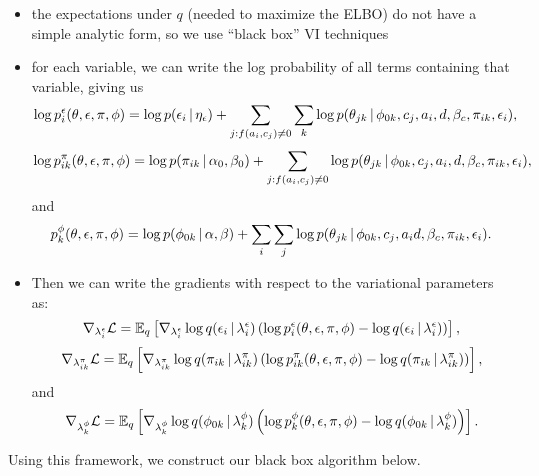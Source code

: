 \begin{itemize}
\item the expectations under $q$ (needed to maximize the ELBO) do not have a simple analytic form, so we use ``black box'' VI techniques
\item for each variable, we can write the log probability of all terms containing that variable, giving us 
\[\log p^\epsilon_{i}(\theta, \epsilon, \pi, \phi) = \log p(\epsilon_{i} \, | \, \eta_\epsilon) + \sum_{j : f(a_i, c_j) \neq 0}\sum_k\log p(\theta_{jk} \, | \, \phi_{0k}, c_j, a_i, d, \beta_c, \pi_{ik}, \epsilon_i),\]
\[\log p^\pi_{ik}(\theta, \epsilon, \pi, \phi) = \log p(\pi_{ik} \, | \, \alpha_0, \beta_0) + \sum_{j : f(a_i, c_j) \neq 0}\log p(\theta_{jk} \, | \, \phi_{0k}, c_j, a_i, d, \beta_c, \pi_{ik}, \epsilon_i),\]
and
\[p^\phi_{k}(\theta, \epsilon, \pi, \phi) = \log p(\phi_{0k} \, | \, \alpha, \beta) + \sum_i\sum_{j} \log p(\theta_{jk} \, | \, \phi_{0k}, c_j, a_i d, \beta_c, \pi_{ik}, \epsilon_i).\]
\item Then we can write the gradients with respect to the variational parameters as:
\[\nabla_{\lambda^\epsilon_{i}} \mathcal{L} = \mathbb{E}_q \left[ \nabla_{\lambda^\epsilon_{i}} \log q(\epsilon_{i} \, | \, \lambda^\epsilon_{i}) \left( \log p^\epsilon_{i}(\theta, \epsilon, \pi, \phi) - \log q(\epsilon_{i} \, | \, \lambda^\epsilon_{i}) \right)\right],\]
\[\nabla_{\lambda^\pi_{ik}} \mathcal{L} = \mathbb{E}_q \left[ \nabla_{\lambda^\pi_{ik}} \log q(\pi_{ik} \, | \, \lambda^\pi_{ik}) \left( \log p^\pi_{ik}(\theta, \epsilon, \pi, \phi) - \log q(\pi_{ik} \, | \, \lambda^\pi_{ik}) \right)\right],\]
and
\[\nabla_{\lambda^\phi_{k}} \mathcal{L} = \mathbb{E}_q \left[ \nabla_{\lambda^\phi_{k}} \log q(\phi_{0k} \, | \, \lambda^\phi_{k}) \left( \log p^\phi_{k}(\theta, \epsilon, \pi, \phi) - \log q(\phi_{0k} \, | \, \lambda^\phi_{k}) \right)\right].\]
\end{itemize}

Using this framework, we construct our black box algorithm below. 

